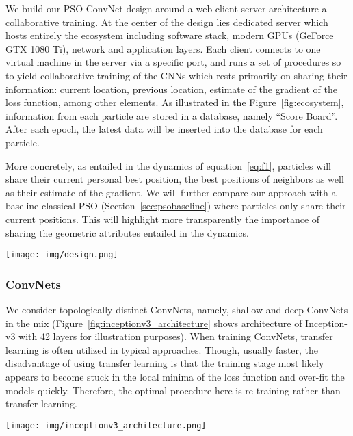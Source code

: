 \documentclass{ieeeaccess}
\begin{document}
We build our PSO-ConvNet design around a web client-server architecture a collaborative training. At the center of the design lies dedicated server which hosts entirely the ecosystem including software stack, modern GPUs (GeForce\textsuperscript{\textregistered} GTX 1080 Ti), network and application layers. Each client connects to one virtual machine in the server via a specific port, and runs a set of procedures so to yield collaborative training of the CNNs which rests primarily on sharing their information: current location, previous location, estimate of the gradient of the loss function, among other elements. As illustrated in the Figure~\ref{fig:ecosystem}, information from each particle are stored in a database, namely ``Score Board''. After each epoch, the latest data will be
inserted into the database for each particle.

More concretely, as entailed in the dynamics of equation~\eqref{eq:f1}, particles will share their current personal best position, the best positions of neighbors as well as their estimate of the gradient. We will further compare our approach with a baseline classical PSO (Section~\ref{sec:psobaseline}) where particles only share their current positions. This will highlight more transparently the importance of sharing the geometric attributes entailed in the dynamics.
\begin{figure*}[p]
\begin{center}
\texttt{[image: img/design.png]}
\caption{Proposed PSO-ConvNets system. PSOs share information with other particles via a file sharing. The information include current location, previous location among the others.}
\label{fig:ecosystem}
\end{center}
\end{figure*}
\subsubsection{ConvNets}
\label{sec:convnets}
We consider topologically distinct ConvNets, namely, shallow and deep ConvNets in the mix (Figure~\ref{fig:inceptionv3_architecture} shows architecture of Inception-v3 with 42 layers for illustration purposes). When training ConvNets, transfer learning is often utilized in typical approaches. Though, usually faster, the disadvantage of using transfer learning is that the training stage most likely appears to become stuck in the local minima of the loss function and over-fit the models quickly. Therefore, the optimal procedure here is re-training rather than transfer learning.
\begin{figure*}[p]
\begin{center}
\texttt{[image: img/inceptionv3\_architecture.png]}
\caption{Detail of Inception-v3 architecture~\cite{szegedy2017inception} which contains initial layers and several modules A, B and C. Each module comprises factorized convolutions to reduce the computational cost as it decreases the number of parameters.}
\label{fig:inceptionv3_architecture}
\end{center}
\end{figure*}
\end{document}
